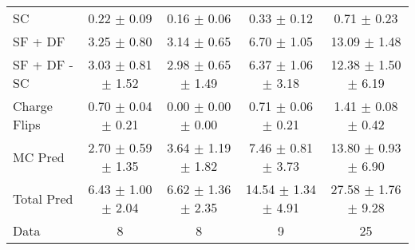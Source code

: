 \begin{tabular}{l|cccc}
                                 SC &  0.22 $\pm$  0.09 &  0.16 $\pm$  0.06 &  0.33 $\pm$  0.12 &  0.71 $\pm$  0.23 \\
                            SF + DF &  3.25 $\pm$  0.80 &  3.14 $\pm$  0.65 &  6.70 $\pm$  1.05 & 13.09 $\pm$  1.48 \\
\hline
                       SF + DF - SC &  3.03 $\pm$  0.81 $\pm$  1.52 &  2.98 $\pm$  0.65 $\pm$  1.49 &  6.37 $\pm$  1.06 $\pm$  3.18 & 12.38 $\pm$  1.50 $\pm$  6.19 \\
\hline\hline
                       Charge Flips &  0.70 $\pm$  0.04 $\pm$  0.21 &  0.00 $\pm$  0.00 $\pm$  0.00 &  0.71 $\pm$  0.06 $\pm$  0.21 &  1.41 $\pm$  0.08 $\pm$  0.42 \\
\hline
                            MC Pred &  2.70 $\pm$  0.59 $\pm$  1.35 &  3.64 $\pm$  1.19 $\pm$  1.82 &  7.46 $\pm$  0.81 $\pm$  3.73 & 13.80 $\pm$  0.93 $\pm$  6.90 \\
\hline
                         Total Pred &  6.43 $\pm$  1.00 $\pm$  2.04 &  6.62 $\pm$  1.36 $\pm$  2.35 & 14.54 $\pm$  1.34 $\pm$  4.91 & 27.58 $\pm$  1.76 $\pm$  9.28 \\
\hline\hline
                               Data &     8 &     8 &     9 &    25 \\
\hline\hline
\end{tabular}

